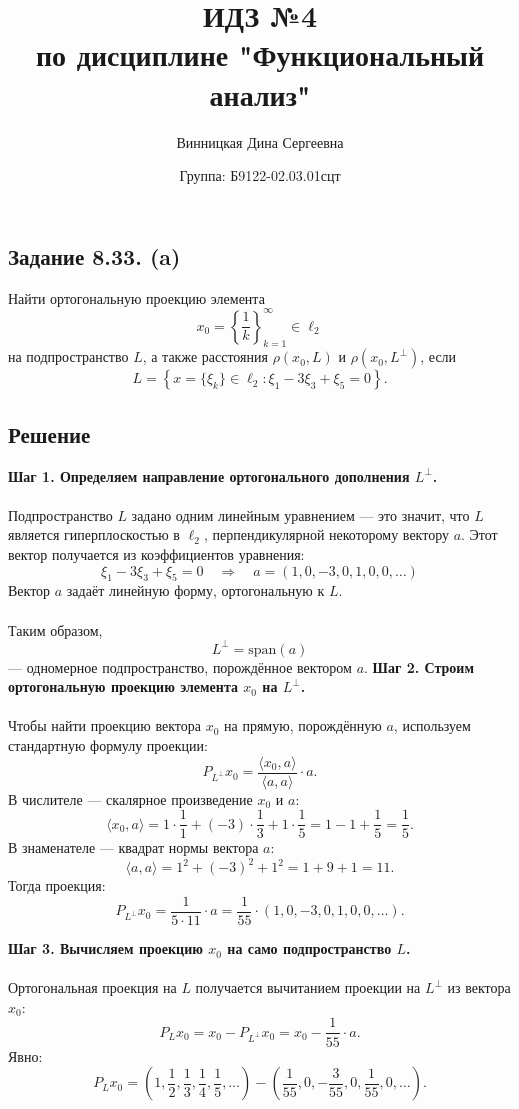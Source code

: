 \documentclass{article}
\title{\textbf{ИДЗ №4 \\ по дисциплине "Функциональный анализ"}}
\author{Винницкая Дина Сергеевна}
\date{Группа: Б9122-02.03.01сцт}
\begin{document}
	
	\maketitle

\subsection{Задание 8.33. (a)} Найти ортогональную проекцию элемента
\[
x_0 = \left\{ \frac{1}{k} \right\}_{k=1}^{\infty} \in \ell_2
\]
на подпространство $L$, а также расстояния $\rho(x_0, L)$ и $\rho(x_0, L^\perp)$, если
$$
    L = \left\{ x = \{\xi_k\} \in \ell_2 : \xi_1 - 3\xi_3 + \xi_5 = 0 \right\}.
    $$



\subsection{Решение}


\textbf{Шаг 1. Определяем направление ортогонального дополнения \(L^\perp\).}\\ \\
Подпространство $L$ задано одним линейным уравнением — это значит, что $L$ является гиперплоскостью в $\ell_2$, перпендикулярной некоторому вектору $a$. Этот вектор получается из коэффициентов уравнения:
\[
\xi_1 - 3\xi_3 + \xi_5 = 0 \quad \Rightarrow \quad a = (1, 0, -3, 0, 1, 0, 0, \dots)
\]
Вектор $a$ задаёт линейную форму, ортогональную к $L$.\\ \\ Таким образом,
\[
L^\perp = \text{span}(a)
\]
— одномерное подпространство, порождённое вектором $a$.
\vspace{0.7em}
\textbf{Шаг 2. Строим ортогональную проекцию элемента \(x_0\) на \(L^\perp\).}\\ \\
Чтобы найти проекцию вектора $x_0$ на прямую, порождённую $a$, используем стандартную формулу проекции:
\[
P_{L^\perp} x_0 = \frac{\langle x_0, a \rangle}{\langle a, a \rangle} \cdot a.
\]
В числителе — скалярное произведение $x_0$ и $a$:
\[
\langle x_0, a \rangle = 1 \cdot \frac{1}{1} + (-3) \cdot \frac{1}{3} + 1 \cdot \frac{1}{5} = 1 - 1 + \frac{1}{5} = \frac{1}{5}.
\]
В знаменателе — квадрат нормы вектора $a$:
\[
\langle a, a \rangle = 1^2 + (-3)^2 + 1^2 = 1 + 9 + 1 = 11.
\]
Тогда проекция:
\[
P_{L^\perp} x_0 = \frac{1}{5 \cdot 11} \cdot a = \frac{1}{55} \cdot (1, 0, -3, 0, 1, 0, 0, \dots).
\]

\vspace{0.7em}
\textbf{Шаг 3. Вычисляем проекцию \(x_0\) на само подпространство \(L\).} \\ \\Ортогональная проекция на $L$ получается вычитанием проекции на $L^\perp$ из вектора $x_0$:
\[
P_L x_0 = x_0 - P_{L^\perp} x_0 = x_0 - \frac{1}{55} \cdot a.
\]
Явно:
\[
P_L x_0 = \left(1, \frac{1}{2}, \frac{1}{3}, \frac{1}{4}, \frac{1}{5}, \dots\right)
- \left( \frac{1}{55}, 0, -\frac{3}{55}, 0, \frac{1}{55}, 0, \dots \right).
\]
\end{document}
